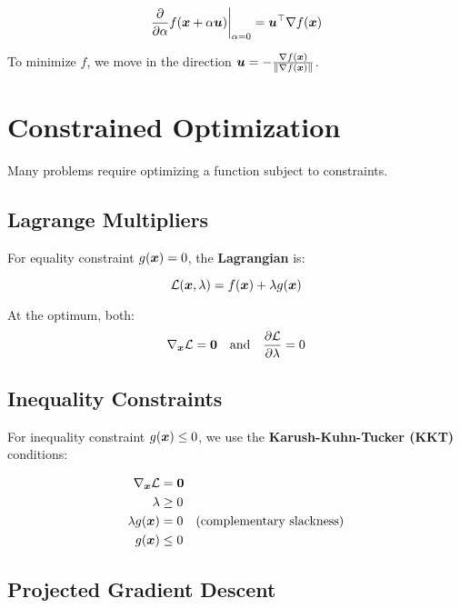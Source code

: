 \begin{equation}
\frac{\partial}{\partial \alpha} f(\boldsymbol{x} + \alpha \boldsymbol{u}) \bigg|_{\alpha=0} = \boldsymbol{u}^\top \nabla f(\boldsymbol{x})
\end{equation}

To minimize $f$, we move in the direction $\boldsymbol{u} = -\frac{\nabla f(\boldsymbol{x})}{\|\nabla f(\boldsymbol{x})\|}$.

\section{Constrained Optimization}
\label{sec:constrained-optimization}

Many problems require optimizing a function subject to constraints.

\subsection{Lagrange Multipliers}

For equality constraint $g(\boldsymbol{x}) = 0$, the \textbf{Lagrangian} is:

\begin{equation}
\mathcal{L}(\boldsymbol{x}, \lambda) = f(\boldsymbol{x}) + \lambda g(\boldsymbol{x})
\end{equation}

At the optimum, both:
\begin{equation}
\nabla_{\boldsymbol{x}} \mathcal{L} = \boldsymbol{0} \quad \text{and} \quad \frac{\partial \mathcal{L}}{\partial \lambda} = 0
\end{equation}

\subsection{Inequality Constraints}

For inequality constraint $g(\boldsymbol{x}) \leq 0$, we use the \textbf{Karush-Kuhn-Tucker (KKT)} conditions:

\begin{align}
\nabla_{\boldsymbol{x}} \mathcal{L} &= \boldsymbol{0} \\
\lambda &\geq 0 \\
\lambda g(\boldsymbol{x}) &= 0 \quad \text{(complementary slackness)} \\
g(\boldsymbol{x}) &\leq 0
\end{align}

\subsection{Projected Gradient Descent}

